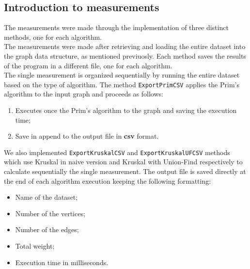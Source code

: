 \subsection{Introduction to measurements}
The measurements were made through the implementation of three distinct methods, one for each algorithm. \\ \noindent
The measurements were made after retrieving and loading the entire dataset into the graph data structure, as mentioned 
previuosly. Each method saves the results of the program in a different file, one for each algorithm.\\
\noindent
The single measurement is organized sequentially by running the entire dataset based on the type of algorithm. 
The method \verb|ExportPrimCSV| applies the Prim's algorithm to the input graph and proceeds as follows:
\begin{enumerate}
    \item Executes once the Prim's algorithm to the graph and saving the execution time;
    \item Save in append to the output file in \textbf{csv} format. 
\end{enumerate}
We also implemented \verb|ExportKruskalCSV| and \verb|ExportKruskalUFCSV| methods which use Kruskal in naive version and 
Kruskal with Union-Find respectively to calculate sequentially the single measurement.
\noindent
The output file is saved directly at the end of each algorithm execution keeping the following formatting:
\begin{itemize}
    \item Name of the dataset;
    \item Number of the vertices;
    \item Number of the edges;
    \item Total weight;
    \item Execution time in milliseconds.
\end{itemize}